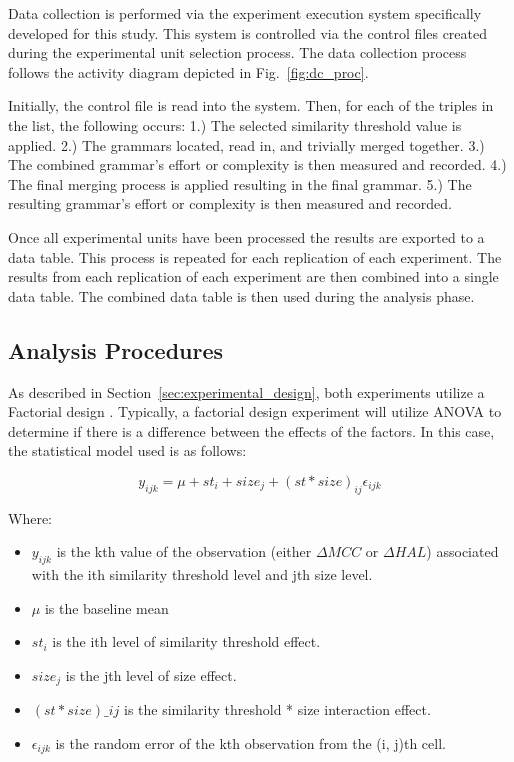 \documentclass[conference]{IEEEtran}
\providecommand{\tightlist}{%
  \setlength{\itemsep}{0pt}\setlength{\parskip}{0pt}}
\begin{document}
Data collection is performed via the experiment execution system
specifically developed for this study. This system is controlled via the
control files created during the experimental unit selection process.
The data collection process follows the activity diagram depicted in
Fig.~\ref{fig:dc_proc}.

Initially, the control file is read into the system. Then, for each of
the triples in the list, the following occurs: 1.) The selected
similarity threshold value is applied. 2.) The grammars located, read
in, and trivially merged together. 3.) The combined grammar's effort or
complexity is then measured and recorded. 4.) The final merging process
is applied resulting in the final grammar. 5.) The resulting grammar's
effort or complexity is then measured and recorded.

Once all experimental units have been processed the results are exported
to a data table. This process is repeated for each replication of each
experiment. The results from each replication of each experiment are
then combined into a single data table. The combined data table is then
used during the analysis phase.

\hypertarget{sec:analysis_proc}{%
\subsection{Analysis Procedures}\label{sec:analysis_proc}}

As described in Section~\ref{sec:experimental_design}, both experiments
utilize a Factorial design
\cite{montgomeryDesignAnalysisExperiments2013}. Typically, a factorial
design experiment will utilize ANOVA to determine if there is a
difference between the effects of the factors. In this case, the
statistical model used is as follows:

\[y_{ijk} = \mu + st_i + size_j + (st * size)_{ij} \epsilon_{ijk}\]

\noindent Where:

\begin{itemize}
\tightlist
\item
  \(y_{ijk}\) is the kth value of the observation (either \(\Delta MCC\)
  or \(\Delta HAL\)) associated with the ith similarity threshold level
  and jth size level.
\item
  \(\mu\) is the baseline mean
\item
  \(st_{i}\) is the ith level of similarity threshold effect.
\item
  \(size_{j}\) is the jth level of size effect.
\item
  \((st * size)\_{ij}\) is the similarity threshold * size interaction
  effect.
\item
  \(\epsilon_{ijk}\) is the random error of the kth observation from the
  (i, j)th cell.
\end{itemize}
\end{document}
